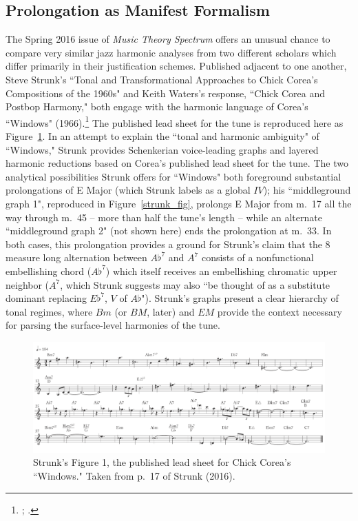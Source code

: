 \subsection{Prolongation as Manifest Formalism}

The Spring 2016 issue of \emph{Music Theory Spectrum} offers an unusual chance to compare very similar jazz harmonic analyses from two different scholars which differ primarily in their justification schemes.  Published adjacent to one another, Steve Strunk's ``Tonal and Transformational Approaches to Chick Corea's Compositions of the 1960s" and Keith Waters's response, ``Chick Corea and Postbop Harmony," both engage with the harmonic language of Corea's ``Windows" (1966).\footnote{\cite{strunk2016}; \cite{waters2016}.}  The published lead sheet for the tune is reproduced here as Figure~\ref{windows}.  In an attempt to explain the ``tonal and harmonic ambiguity" of ``Windows," Strunk provides Schenkerian voice-leading graphs and layered harmonic reductions based on Corea's published lead sheet for the tune.  The two analytical possibilities Strunk offers for ``Windows" both foreground substantial prolongations of E Major (which Strunk labels as a global $IV$); his ``middleground graph 1", reproduced in Figure~\ref{strunk_fig}, prolongs E Major from m.\ 17 all the way through m.\ 45 -- more than half the tune's length -- while an alternate ``middleground graph 2" (not shown here) ends the prolongation at m.\ 33.  In both cases, this prolongation provides a ground for Strunk's claim that the 8 measure long alternation between $A\flat^7$ and $A^7$ consists of a nonfunctional embellishing chord ($A\flat^7$) which itself receives an embellishing chromatic upper neighbor ($A^7$, which Strunk suggests may also ``be thought of as a substitute dominant replacing $E\flat^7$, $V$ of $A\flat$").  Strunk's graphs present a clear hierarchy of tonal regimes, where $Bm$ (or $BM$, later) and $EM$ provide the context necessary for parsing the surface-level harmonies of the tune.

\begin{figure}
	\centering
	\caption{Strunk's Figure 1, the published lead sheet for Chick Corea's ``Windows."  Taken from p.\ 17 of Strunk (2016).}\label{windows}
	\includegraphics[width=6in]{strunk_windows.png}	
\end{figure}

